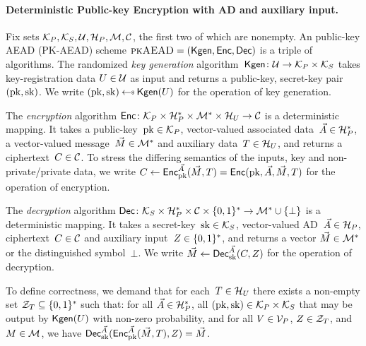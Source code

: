 \paragraph{Deterministic Public-key Encryption with AD and auxiliary input. }
Fix sets $\mathcal{K}_P, \mathcal{K}_S, \mathcal{U}, \mathcal{H}_P, \mathcal{M},\mathcal{C}$, the first two of which are nonempty.  An public-key AEAD
(PK-AEAD) scheme $\textsc{pkAEAD}=(\mathsf{Kgen},{\mathsf{Enc}},{\mathsf{Dec}})$ is a triple of algorithms.  The randomized \emph{key generation} algorithm~$\mathsf{Kgen}\colon\mathcal{U}\to\mathcal{K}_P\times\mathcal{K}_S$ takes key-registration data $U \in \mathcal{U}$ as input and returns a public-key, secret-key pair $(\mathrm{pk},\mathrm{sk})$.  We write $(\pk,\sk)\getsr\Kgen(\kreg)$ for the operation of key generation. 

The \emph{encryption} algorithm ${\mathsf{Enc}} \colon \mathcal{K}_P \times \mathcal{H}_P^* \times \mathcal{M}^* \times \mathcal{H}_U \to \mathcal{C}$ is a deterministic mapping.  It takes a public-key~$\mathrm{pk}\in\mathcal{K}_P$, vector-valued associated data~$\vec{A} \in \mathcal{H}_P^*$,  a vector-valued message~$\vec{M} \in \mathcal{M}^*$ and auxiliary data~$T \in \mathcal{H}_U$, and returns a ciphertext~$C \in \mathcal{C}$. 
To stress the differing semantics of the inputs, key and non-private/private data, we write $C\gets{\mathsf{Enc}}_{\mathrm{pk}}^{\vec{A}}(\vec{M},T) ={\mathsf{Enc}}(\mathrm{pk},\vec{A}, \vec{M},T)$ for the operation of encryption. 


The \emph{decryption} algorithm ${\mathsf{Dec}} \colon \mathcal{K}_S \times \mathcal{H}_P^* \times \mathcal{C} \times \{0,1\}^* \to \mathcal{M}^* \cup \{\bot\}$ is a deterministic mapping.  It takes a secret-key~$\mathrm{sk}\in\mathcal{K}_S$, vector-valued AD~$\vec{A} \in \mathcal{H}_P$, ciphertext~$C \in \mathcal{C}$ and auxiliary input~$Z\in\{0,1\}^*$, and returns a vector $\vec{M} \in \mathcal{M}^*$ or the distinguished symbol~$\bot$.  We write $\vec{M} \gets {\mathsf{Dec}}_{\mathrm{sk}}^{\vec{A}}(C,Z)$ for the operation of decryption.   

To define correctness, we demand that for each~$T\in\mathcal{H}_U$ there exists a non-empty set $\mathcal{Z}_T \subseteq \{0,1\}^*$ such that:  for all $\vec{A}\in\mathcal{H}_P^*$, all $(\mathrm{pk},\mathrm{sk})\in\mathcal{K}_P\times\mathcal{K}_S$ that may be output by $\mathsf{Kgen}(U)$ with non-zero probability, and for all $V\in\mathcal{V}_P$, $Z\in\mathcal{Z}_T$,  and $M\in\mathcal{M}$, we have ${\mathsf{Dec}}_{\mathrm{sk}}^{\vec{A}}({\mathsf{Enc}}_{\mathrm{pk}}^{\vec{A}}(\vec{M},T),Z)=\vec{M}$. 

